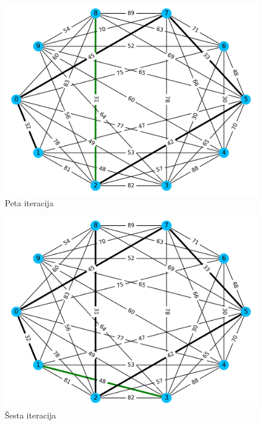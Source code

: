 \documentclass[conference]{IEEEtran}
\begin{document}
\begin{figure}[H]
\centering
\includegraphics[width=1\linewidth]{slike/300dpi/5d.jpg}
\caption{Peta iteracija}
\label{figmat}
\end{figure}

\begin{figure}[H]
\centering
\includegraphics[width=1\linewidth]{slike/300dpi/6d.jpg}
\caption{Šesta iteracija}
\label{figmat}
\end{figure}
\end{document}
